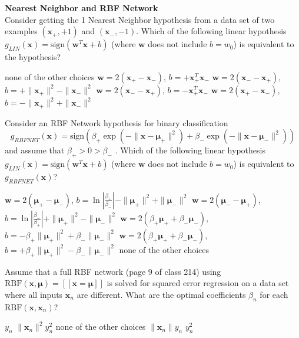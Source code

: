 \documentclass[a4paper,10pt]{exam}
\begin{document}
\begin{questions}
		\question \textbf{Nearest Neighbor and RBF Network}\\
		Consider getting the 1 Nearest Neighbor hypothesis from a data set of two examples $(\mathbf{x}_+, +1)$ and $(\mathbf{x}_-, -1)$. Which of the following linear hypothesis $g_{LIN}(\mathbf{x}) = \mbox{sign}(\mathbf{w}^T \mathbf{x} + b)$ (where $\mathbf{w}$ does not include $b = w_0$) is equivalent to the hypothesis?
		\begin{checkboxes}
			\choice none of the other choices
			\choice $\mathbf{w} = 2 (\mathbf{x}_+ - \mathbf{x}_-)$, $b = + \mathbf{x}_+^T \mathbf{x}_-$
			\choice $\mathbf{w} = 2 (\mathbf{x}_- - \mathbf{x}_+)$, $b = + \|\mathbf{x}_+\|^2 - \|\mathbf{x}_-\|^2$
			\choice $\mathbf{w} = 2 (\mathbf{x}_- - \mathbf{x}_+)$, $b = -\mathbf{x}_+^T \mathbf{x}_-$
			\CorrectChoice $\mathbf{w} = 2 (\mathbf{x}_+ - \mathbf{x}_-)$, $b = - \|\mathbf{x}_+\|^2 + \|\mathbf{x}_-\|^2$\\
		\end{checkboxes}
		
		\question Consider an RBF Network hypothesis for binary classification 
		\[g_{RBFNET}(\mathbf{x}) = \mbox{sign}\left(\beta_+ \exp(-\|\mathbf{x} - {\boldsymbol\mu}_+\|^2) + \beta_- \exp(-\|\mathbf{x} - {\boldsymbol\mu}_-\|^2)\right)\]
		and assume that $\beta_+ > 0 > \beta_-$ . Which of the following linear hypothesis $g_{LIN}(\mathbf{x}) = \mbox{sign}(\mathbf{w}^T \mathbf{x} + b)$ (where $\mathbf{w}$ does not include $b = w_0$) is equivalent to $g_{RBFNET}(\mathbf{x})$?
		\begin{checkboxes}
			\CorrectChoice $\mathbf{w} = 2 ({\boldsymbol\mu}_+ - {\boldsymbol\mu}_-)$, $b = \ln \left|\frac{\beta_+}{\beta_-}\right| - \|{\boldsymbol\mu}_+\|^2 + \|{\boldsymbol\mu}_-\|^2$
			\choice $\mathbf{w} = 2 ({\boldsymbol\mu}_- - {\boldsymbol\mu}_+)$, $b = \ln \left|\frac{\beta_-}{\beta_+}\right| + \|{\boldsymbol\mu}_+\|^2 - \|{\boldsymbol\mu}_-\|^2$
			\choice $\mathbf{w} = 2 (\beta_+ {\boldsymbol\mu}_+ + \beta_- {\boldsymbol\mu}_-)$, $b = - \beta_+\|{\boldsymbol\mu}_+\|^2 + \beta_- \|{\boldsymbol\mu}_-\|^2$
			\choice $\mathbf{w} = 2 (\beta_+ {\boldsymbol\mu}_+ + \beta_- {\boldsymbol\mu}_-)$, $b = + \beta_+\|{\boldsymbol\mu}_+\|^2 - \beta_- \|{\boldsymbol\mu}_-\|^2$
			\choice none of the other choices\\
	   \end{checkboxes}
	   
	   \question Assume that a full RBF network (page 9 of class 214) using $\mbox{RBF}(\mathbf{x}, {\boldsymbol\mu}) = [[\mathbf{x} = {    \boldsymbol\mu}]]$ is solved for squared error regression on a data set where all inputs $\mathbf{x}_n$ are different. What are the optimal coefficients $\beta_n$ for each $\mbox{RBF}(\mathbf{x}, \mathbf{x}_n)$?
	   \begin{checkboxes}
	   	 \CorrectChoice $y_n$
	   	 \choice $\|\mathbf{x}_n\|^2 y_n^2$
	   	 \choice none of the other choices
	   	 \choice $\|\mathbf{x}_n\| y_n$
	   	 \choice $y_n^2$\\
	   \end{checkboxes}
		

\end{questions}
\end{document}
